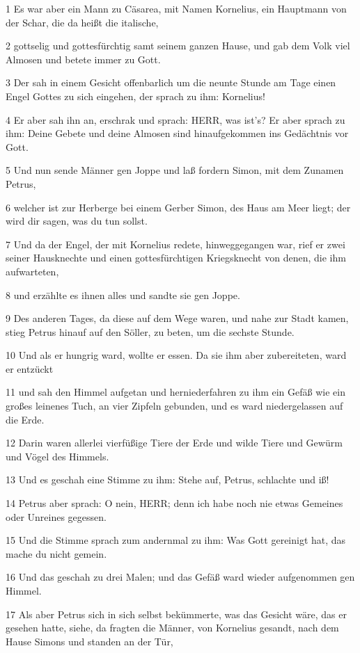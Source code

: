 \par 1 Es war aber ein Mann zu Cäsarea, mit Namen Kornelius, ein Hauptmann von der Schar, die da heißt die italische,
\par 2 gottselig und gottesfürchtig samt seinem ganzen Hause, und gab dem Volk viel Almosen und betete immer zu Gott.
\par 3 Der sah in einem Gesicht offenbarlich um die neunte Stunde am Tage einen Engel Gottes zu sich eingehen, der sprach zu ihm: Kornelius!
\par 4 Er aber sah ihn an, erschrak und sprach: HERR, was ist's? Er aber sprach zu ihm: Deine Gebete und deine Almosen sind hinaufgekommen ins Gedächtnis vor Gott.
\par 5 Und nun sende Männer gen Joppe und laß fordern Simon, mit dem Zunamen Petrus,
\par 6 welcher ist zur Herberge bei einem Gerber Simon, des Haus am Meer liegt; der wird dir sagen, was du tun sollst.
\par 7 Und da der Engel, der mit Kornelius redete, hinweggegangen war, rief er zwei seiner Hausknechte und einen gottesfürchtigen Kriegsknecht von denen, die ihm aufwarteten,
\par 8 und erzählte es ihnen alles und sandte sie gen Joppe.
\par 9 Des anderen Tages, da diese auf dem Wege waren, und nahe zur Stadt kamen, stieg Petrus hinauf auf den Söller, zu beten, um die sechste Stunde.
\par 10 Und als er hungrig ward, wollte er essen. Da sie ihm aber zubereiteten, ward er entzückt
\par 11 und sah den Himmel aufgetan und herniederfahren zu ihm ein Gefäß wie ein großes leinenes Tuch, an vier Zipfeln gebunden, und es ward niedergelassen auf die Erde.
\par 12 Darin waren allerlei vierfüßige Tiere der Erde und wilde Tiere und Gewürm und Vögel des Himmels.
\par 13 Und es geschah eine Stimme zu ihm: Stehe auf, Petrus, schlachte und iß!
\par 14 Petrus aber sprach: O nein, HERR; denn ich habe noch nie etwas Gemeines oder Unreines gegessen.
\par 15 Und die Stimme sprach zum andernmal zu ihm: Was Gott gereinigt hat, das mache du nicht gemein.
\par 16 Und das geschah zu drei Malen; und das Gefäß ward wieder aufgenommen gen Himmel.
\par 17 Als aber Petrus sich in sich selbst bekümmerte, was das Gesicht wäre, das er gesehen hatte, siehe, da fragten die Männer, von Kornelius gesandt, nach dem Hause Simons und standen an der Tür,
